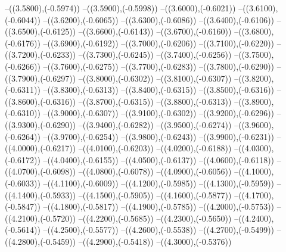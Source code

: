 {	--({\sx*(3.5800)},{\sy*(-0.5974)})
	--({\sx*(3.5900)},{\sy*(-0.5998)})
	--({\sx*(3.6000)},{\sy*(-0.6021)})
	--({\sx*(3.6100)},{\sy*(-0.6044)})
	--({\sx*(3.6200)},{\sy*(-0.6065)})
	--({\sx*(3.6300)},{\sy*(-0.6086)})
	--({\sx*(3.6400)},{\sy*(-0.6106)})
	--({\sx*(3.6500)},{\sy*(-0.6125)})
	--({\sx*(3.6600)},{\sy*(-0.6143)})
	--({\sx*(3.6700)},{\sy*(-0.6160)})
	--({\sx*(3.6800)},{\sy*(-0.6176)})
	--({\sx*(3.6900)},{\sy*(-0.6192)})
	--({\sx*(3.7000)},{\sy*(-0.6206)})
	--({\sx*(3.7100)},{\sy*(-0.6220)})
	--({\sx*(3.7200)},{\sy*(-0.6233)})
	--({\sx*(3.7300)},{\sy*(-0.6245)})
	--({\sx*(3.7400)},{\sy*(-0.6256)})
	--({\sx*(3.7500)},{\sy*(-0.6266)})
	--({\sx*(3.7600)},{\sy*(-0.6275)})
	--({\sx*(3.7700)},{\sy*(-0.6283)})
	--({\sx*(3.7800)},{\sy*(-0.6290)})
	--({\sx*(3.7900)},{\sy*(-0.6297)})
	--({\sx*(3.8000)},{\sy*(-0.6302)})
	--({\sx*(3.8100)},{\sy*(-0.6307)})
	--({\sx*(3.8200)},{\sy*(-0.6311)})
	--({\sx*(3.8300)},{\sy*(-0.6313)})
	--({\sx*(3.8400)},{\sy*(-0.6315)})
	--({\sx*(3.8500)},{\sy*(-0.6316)})
	--({\sx*(3.8600)},{\sy*(-0.6316)})
	--({\sx*(3.8700)},{\sy*(-0.6315)})
	--({\sx*(3.8800)},{\sy*(-0.6313)})
	--({\sx*(3.8900)},{\sy*(-0.6310)})
	--({\sx*(3.9000)},{\sy*(-0.6307)})
	--({\sx*(3.9100)},{\sy*(-0.6302)})
	--({\sx*(3.9200)},{\sy*(-0.6296)})
	--({\sx*(3.9300)},{\sy*(-0.6290)})
	--({\sx*(3.9400)},{\sy*(-0.6282)})
	--({\sx*(3.9500)},{\sy*(-0.6274)})
	--({\sx*(3.9600)},{\sy*(-0.6264)})
	--({\sx*(3.9700)},{\sy*(-0.6254)})
	--({\sx*(3.9800)},{\sy*(-0.6243)})
	--({\sx*(3.9900)},{\sy*(-0.6231)})
	--({\sx*(4.0000)},{\sy*(-0.6217)})
	--({\sx*(4.0100)},{\sy*(-0.6203)})
	--({\sx*(4.0200)},{\sy*(-0.6188)})
	--({\sx*(4.0300)},{\sy*(-0.6172)})
	--({\sx*(4.0400)},{\sy*(-0.6155)})
	--({\sx*(4.0500)},{\sy*(-0.6137)})
	--({\sx*(4.0600)},{\sy*(-0.6118)})
	--({\sx*(4.0700)},{\sy*(-0.6098)})
	--({\sx*(4.0800)},{\sy*(-0.6078)})
	--({\sx*(4.0900)},{\sy*(-0.6056)})
	--({\sx*(4.1000)},{\sy*(-0.6033)})
	--({\sx*(4.1100)},{\sy*(-0.6009)})
	--({\sx*(4.1200)},{\sy*(-0.5985)})
	--({\sx*(4.1300)},{\sy*(-0.5959)})
	--({\sx*(4.1400)},{\sy*(-0.5933)})
	--({\sx*(4.1500)},{\sy*(-0.5905)})
	--({\sx*(4.1600)},{\sy*(-0.5877)})
	--({\sx*(4.1700)},{\sy*(-0.5847)})
	--({\sx*(4.1800)},{\sy*(-0.5817)})
	--({\sx*(4.1900)},{\sy*(-0.5785)})
	--({\sx*(4.2000)},{\sy*(-0.5753)})
	--({\sx*(4.2100)},{\sy*(-0.5720)})
	--({\sx*(4.2200)},{\sy*(-0.5685)})
	--({\sx*(4.2300)},{\sy*(-0.5650)})
	--({\sx*(4.2400)},{\sy*(-0.5614)})
	--({\sx*(4.2500)},{\sy*(-0.5577)})
	--({\sx*(4.2600)},{\sy*(-0.5538)})
	--({\sx*(4.2700)},{\sy*(-0.5499)})
	--({\sx*(4.2800)},{\sy*(-0.5459)})
	--({\sx*(4.2900)},{\sy*(-0.5418)})
	--({\sx*(4.3000)},{\sy*(-0.5376)})
}
